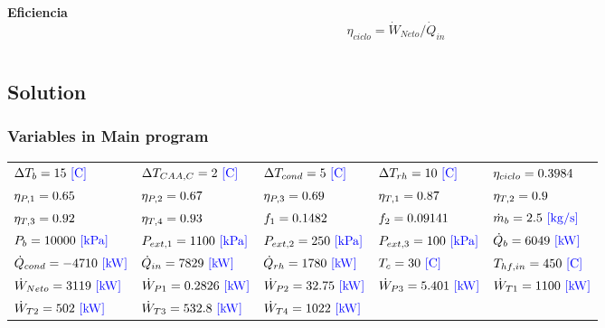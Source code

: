 \documentclass[10pt,fleqn]{article}
\theoremstyle{mytheoremstyle}
\theoremstyle{mytheoremstyle}
\theoremstyle{myproblemstyle}
\begin{document}
\vspace{0.10in}
\noindent
{\color{red} \bf Eficiencia}
\begin{equation}
\label{EES Eqn:87}
\eta_{ciclo}= \dot {W}_{Neto}/\dot {Q}_{in} 
\end{equation}
\begin{verbatim}
\end{verbatim}  
\subsection*{Solution}
\subsubsection*{Variables in Main program}
\vspace{-0.18 in}
\setlength\LTleft{0pt}
\setlength\LTright{0pt}
\begin{longtable}{lllll}
${\Delta T_{b} =15 \rm\ {\color{blue} \left[C\right]}}$ & 
${\Delta T_{CAA,C} =2 \rm\ {\color{blue} \left[C\right]}}$ & 
${\Delta T_{cond} =5 \rm\ {\color{blue} \left[C\right]}}$ & 
${\Delta T_{rh} =10 \rm\ {\color{blue} \left[C\right]}}$ & 
${\eta_{ciclo} =0.3984 \rm}$ \\
${\eta_{P,1} =0.65 \rm}$ & 
${\eta_{P,2} =0.67 \rm}$ & 
${\eta_{P,3} =0.69 \rm}$ & 
${\eta_{T,1} =0.87 \rm}$ & 
${\eta_{T,2} =0.9 \rm}$ \\
${\eta_{T,3} =0.92 \rm}$ & 
${\eta_{T,4} =0.93 \rm}$ & 
${f_{1} =0.1482 \rm}$ & 
${f_{2} =0.09141 \rm}$ & 
${\dot{m}_{b} =2.5 \rm\ {\color{blue} \left[kg/s\right]}}$ \\
${P_{b} =10000 \rm\ {\color{blue} \left[kPa\right]}}$ & 
${P_{ext,1} =1100 \rm\ {\color{blue} \left[kPa\right]}}$ & 
${P_{ext,2} =250 \rm\ {\color{blue} \left[kPa\right]}}$ & 
${P_{ext,3} =100 \rm\ {\color{blue} \left[kPa\right]}}$ & 
${\dot{Q}_{b} =6049 \rm\ {\color{blue} \left[kW\right]}}$ \\
${\dot{Q}_{cond} =-4710 \rm\ {\color{blue} \left[kW\right]}}$ & 
${\dot{Q}_{in} =7829 \rm\ {\color{blue} \left[kW\right]}}$ & 
${\dot{Q}_{rh} =1780 \rm\ {\color{blue} \left[kW\right]}}$ & 
${T_{c} =30 \rm\ {\color{blue} \left[C\right]}}$ & 
${T_{hf,in} =450 \rm\ {\color{blue} \left[C\right]}}$ \\
${\dot{W}_{Neto} =3119 \rm\ {\color{blue} \left[kW\right]}}$ & 
${\dot{W}_{P1} =0.2826 \rm\ {\color{blue} \left[kW\right]}}$ & 
${\dot{W}_{P2} =32.75 \rm\ {\color{blue} \left[kW\right]}}$ & 
${\dot{W}_{P3} =5.401 \rm\ {\color{blue} \left[kW\right]}}$ & 
${\dot{W}_{T1} =1100 \rm\ {\color{blue} \left[kW\right]}}$ \\
${\dot{W}_{T2} =502 \rm\ {\color{blue} \left[kW\right]}}$ & 
${\dot{W}_{T3} =532.8 \rm\ {\color{blue} \left[kW\right]}}$ & 
${\dot{W}_{T4} =1022 \rm\ {\color{blue} \left[kW\right]}}$\end{longtable}
\end{document}
